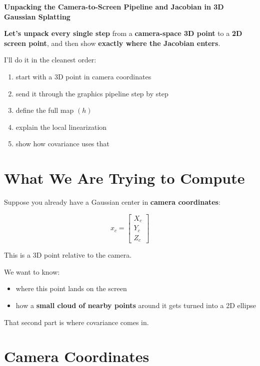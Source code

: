 \documentclass[11pt,letterpaper]{article}
\begin{document}
\begin{center}
{\Large\bfseries Unpacking the Camera-to-Screen Pipeline and Jacobian in 3D Gaussian Splatting\par}
\vspace{0.4em}
\end{center}

\textbf{Let's unpack every single step} from a \textbf{camera-space 3D point} to a \textbf{2D screen point}, and then show \textbf{exactly where the Jacobian enters}.

I'll do it in the cleanest order:

\begin{enumerate}
\item start with a 3D point in camera coordinates
\item send it through the graphics pipeline step by step
\item define the full map $(h)$
\item explain the local linearization
\item show how covariance uses that
\end{enumerate}

\section{What We Are Trying to Compute}

Suppose you already have a Gaussian center in \textbf{camera coordinates}:

\[
x_c =
\begin{bmatrix}
X_c\\
Y_c\\
Z_c
\end{bmatrix}
\]

This is a 3D point relative to the camera.

We want to know:

\begin{itemize}
\item where this point lands on the screen
\item how a \textbf{small cloud of nearby points} around it gets turned into a 2D ellipse
\end{itemize}

That second part is where covariance comes in.

\section{Camera Coordinates}
\end{document}
